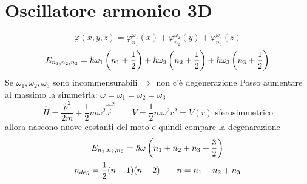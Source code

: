\section{Oscillatore armonico 3D}

\begin{equation*}
    \varphi (x,y,z) = \varphi^{\omega_1}_{n_1}(x) + \varphi^{\omega_2}_{n_2}(y) + \varphi^{\omega_3}_{n_3}(z)
\end{equation*}
\begin{equation*}
     E_{n_1,n_2,n_3} = \hslash\omega_1 \left(n_1 + \frac{1}{2}\right) + \hslash\omega_2 \left(n_2 + \frac{1}{2}\right) + \hslash\omega_3 \left(n_3 + \frac{1}{2}\right)
\end{equation*}
Se \(\omega_1,\omega_2,\omega_3\) sono incommensurabili \(\Rightarrow\) non c'è degenerazione \newline
Posso aumentare al massimo la simmetria: \(\omega = \omega_1 = \omega_2 = \omega_3\)
\begin{equation*}
    \hat{H} = \frac{\hat{p}^2}{2m} + \frac{1}{2} m \omega^2 \hat{\vec{x}}^2 \qquad V = \frac{1}{2}m\omega^2r^2 = V(r) \mbox{ sferosimmetrico}
\end{equation*}
allora nascono nuove costanti del moto e quindi compare la degenarazione
\begin{gather*}
    E_{n_1,n_2,n_3} = \hslash\omega \left(n_1 + n_2 + n_3 + \frac{3}{2}\right) \\
    n_{deg} = \frac{1}{2}(n+1)(n+2) \qquad n = n_1 + n_2 + n_3
\end{gather*}
